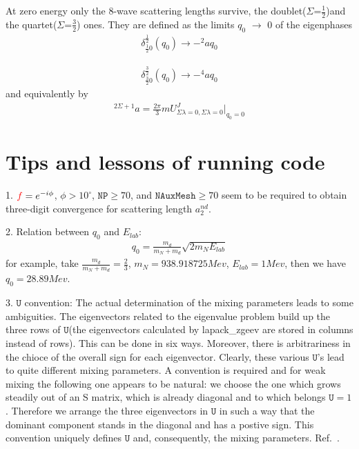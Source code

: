 \documentclass[11pt,aps]{revtex4}
\newcommand{\PF}{{\color{red}f}}
\begin{document}
At zero energy only the 8-wave scattering lengths survive, the doublet($\Sigma$=$\frac1 2$)and the quartet($\Sigma$=$\frac3 2$) ones. They are defined as the limits $q_0$ $\rightarrow$ 0 of the eigenphases
\begin{equation}
\begin{split}
\delta^{\frac 1 2}_{\frac 1 2 0}(q_0)\rightarrow -^2 aq_0
\end{split}
\end{equation}

\begin{equation}
\begin{split}
\delta^{\frac 3 2}_{\frac 3 2 0}(q_0)\rightarrow -^4 aq_0
\end{split}
\end{equation}
and equivalently by
\begin{equation}
\begin{split}
^{2\Sigma+1}a=\frac {2\pi} 3{} mU^{J}_{\Sigma \lambda=0,\Sigma \lambda=0}|_{q_0=0}
\end{split}
\end{equation}

\section{Tips and lessons of running code}

1. $\PF = e^{-i\phi}$, $\phi > 10^\circ$, $\texttt{NP} \geqslant 70$, and $\texttt{NAuxMesh} \geqslant 70$ seem to be required to obtain three-digit convergence for scattering length $a_2^{nd}$.

2. Relation between $q_0$ and $E_{lab}$:
\begin{equation}
\begin{split}
q_0 = \frac{m_d}{m_N+m_d}\sqrt{2m_NE_{lab}}
\end{split}
\end{equation}
for example, take $\frac{m_d}{m_N+m_d} = \frac{2}{3}$, $m_N = 938.918725Mev$, $E_{lab} = 1Mev$, then we have $q_0 = 28.89Mev$.

3. $\texttt{U}$ convention: The actual determination of the mixing parameters leads to some ambiguities. The eigenvectors related to the eigenvalue problem build up the three rows of $\texttt{U}$(the eigenvectors calculated by lapack\_zgeev are stored in columns instead of rows). This can be done in six ways. Moreover, there is arbitrariness in the chioce of the overall sign for each eigenvector. Clearly, these various $\texttt{U}$'s lead to quite different mixing parameters. A convention is required and for weak mixing the following one appears to be natural: we choose the one which grows steadily out of an S matrix, which is already diagonal and to which belongs $\texttt{U} = 1$. Therefore we arrange the three eigenvectors in $\texttt{U}$ in such a way that the dominant component stands in the diagonal and has a postive sign. This convention uniquely defines $\texttt{U}$ and, consequently, the mixing parameters. Ref.~\cite{Huber:1995zza}.
\end{document}
